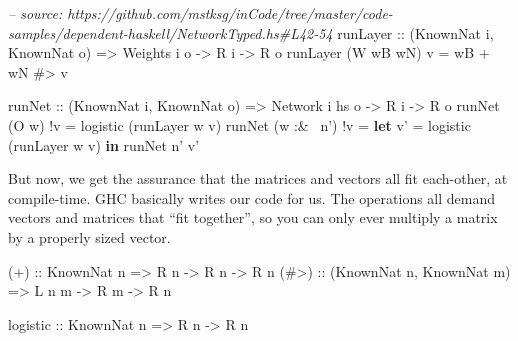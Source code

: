 \documentclass[]{article}
\newenvironment{Shaded}{}{}
\newcommand{\KeywordTok}[1]{\textcolor[rgb]{0.00,0.44,0.13}{\textbf{{#1}}}}
\newcommand{\DataTypeTok}[1]{\textcolor[rgb]{0.56,0.13,0.00}{{#1}}}
\newcommand{\CommentTok}[1]{\textcolor[rgb]{0.38,0.63,0.69}{\textit{{#1}}}}
\newcommand{\OtherTok}[1]{\textcolor[rgb]{0.00,0.44,0.13}{{#1}}}
\newcommand{\FunctionTok}[1]{\textcolor[rgb]{0.02,0.16,0.49}{{#1}}}
\newcommand{\NormalTok}[1]{{#1}}
\begin{document}
\begin{Shaded}
\begin{Highlighting}[]
\CommentTok{-- source: https://github.com/mstksg/inCode/tree/master/code-samples/dependent-haskell/NetworkTyped.hs#L42-54}
\OtherTok{runLayer ::} \NormalTok{(}\DataTypeTok{KnownNat} \NormalTok{i, }\DataTypeTok{KnownNat} \NormalTok{o)}
         \OtherTok{=>} \DataTypeTok{Weights} \NormalTok{i o}
         \OtherTok{->} \DataTypeTok{R} \NormalTok{i}
         \OtherTok{->} \DataTypeTok{R} \NormalTok{o}
\NormalTok{runLayer (}\DataTypeTok{W} \NormalTok{wB wN) v }\FunctionTok{=} \NormalTok{wB }\FunctionTok{+} \NormalTok{wN }\FunctionTok{#>} \NormalTok{v}

\OtherTok{runNet ::} \NormalTok{(}\DataTypeTok{KnownNat} \NormalTok{i, }\DataTypeTok{KnownNat} \NormalTok{o)}
       \OtherTok{=>} \DataTypeTok{Network} \NormalTok{i hs o}
       \OtherTok{->} \DataTypeTok{R} \NormalTok{i}
       \OtherTok{->} \DataTypeTok{R} \NormalTok{o}
\NormalTok{runNet (}\DataTypeTok{O} \NormalTok{w)      }\FunctionTok{!}\NormalTok{v }\FunctionTok{=} \NormalTok{logistic (runLayer w v)}
\NormalTok{runNet (w }\FunctionTok{:&~} \NormalTok{n') }\FunctionTok{!}\NormalTok{v }\FunctionTok{=} \KeywordTok{let} \NormalTok{v' }\FunctionTok{=} \NormalTok{logistic (runLayer w v)}
                       \KeywordTok{in}  \NormalTok{runNet n' v'}
\end{Highlighting}
\end{Shaded}

But now, we get the assurance that the matrices and vectors all fit each-other,
at compile-time. GHC basically writes our code for us. The operations all demand
vectors and matrices that ``fit together'', so you can only ever multiply a
matrix by a properly sized vector.

\begin{Shaded}
\begin{Highlighting}[]
\OtherTok{(+)  ::} \DataTypeTok{KnownNat} \NormalTok{n}
     \OtherTok{=>} \DataTypeTok{R} \NormalTok{n }\OtherTok{->} \DataTypeTok{R} \NormalTok{n }\OtherTok{->} \DataTypeTok{R} \NormalTok{n}
\OtherTok{(#>) ::} \NormalTok{(}\DataTypeTok{KnownNat} \NormalTok{n, }\DataTypeTok{KnownNat} \NormalTok{m)}
     \OtherTok{=>} \DataTypeTok{L} \NormalTok{n m }\OtherTok{->} \DataTypeTok{R} \NormalTok{m }\OtherTok{->} \DataTypeTok{R} \NormalTok{n}

\OtherTok{logistic ::} \DataTypeTok{KnownNat} \NormalTok{n}
         \OtherTok{=>} \DataTypeTok{R} \NormalTok{n }\OtherTok{->} \DataTypeTok{R} \NormalTok{n}
\end{Highlighting}
\end{Shaded}
\end{document}
